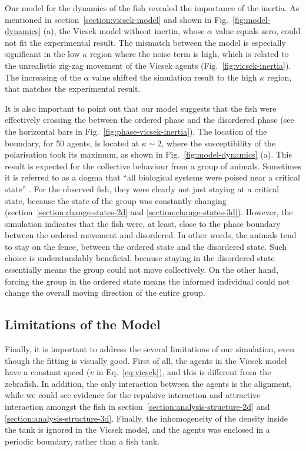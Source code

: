 \documentclass[11pt,twoside]{report}
\begin{document}
Our model for the dynamics of the fish revealed the importance of the inertia. As mentioned in section~\ref{section:vicsek-model} and shown in Fig.~\ref{fig:model-dynamics} (a), the Vicsek model without inertia, whose $\alpha$ value equals zero, could not fit the experimental result. The mismatch between the model is especially significant in the low $\kappa$ region where the noise term is high, which is related to the unrealistic zig-zag movement of the Vicsek agents (Fig.~\ref{fig:vicsek-inertia}). The increasing of the $\alpha$ value shifted the simulation result to the high $\kappa$ region, that matches the experimental result.


It is also important to point out that our model suggests that the fish were effectively crossing the between the ordered phase and the disordered phase (see the horizontal bars in Fig.~\ref{fig:phase-vicsek-inertia}). The location of the boundary, for 50 agents, is located at $\kappa \sim 2$, where the susceptibility of the polarisation took its maximum, as shown in Fig.~\ref{fig:model-dynamics} (a).
This result is expected for the collective behaviour from a group of animals. Sometimes it is referred to as a dogma that ``all biological systems were poised near a critical state'' \cite{mora2011}. For the observed fish, they were clearly not just staying at a critical state, because the state of the group was constantly changing (section~\ref{section:change-states-2d} and \ref{section:change-states-3d}). However, the simulation indicates that the fish were, at least, close to the phase boundary between the ordered movement and disordered. In other words, the animals tend to stay on the fence, between the ordered state and the disordered state.
Such choice is understandably beneficial, because staying in the disordered state essentially means the group could not move collectively. On the other hand, forcing the group in the ordered state means the informed individual could not change the overall moving direction of the entire group.

\subsection{Limitations of the Model}

Finally, it is important to address the several limitations of our simulation, even though the fitting is visually good. First of all, the agents in the Vicsek model have a constant speed ($v$ in Eq.~\ref{eq:vicsek}), and this is different from the zebrafish. In addition, the only interaction between the agents is the alignment, while we could see evidence for the repulsive interaction and attractive interaction amongst the fish in section~\ref{section:analysis-structure-2d} and \ref{section:analysis-structure-3d}. Finally, the inhomogeneity of the density inside the tank is ignored in the Vicsek model, and the agents was enclosed in a periodic boundary, rather than a fish tank.
\end{document}

